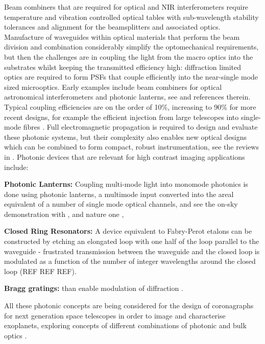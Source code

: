 \documentclass[letterpaper]{ar-1col}
\begin{document}
Beam combiners that are required for optical and NIR interferometers require temperature and vibration controlled optical tables with sub-wavelength stability tolerances and alignment for the beamsplitters and associated optics.
%
Manufacture of waveguides within optical materials that perform the beam division and combination considerably simplify the optomechanical requirements, but then the challenges are in coupling the light from the macro optics into the substrates whilst keeping the transmitted efficiency high: diffraction limited optics are required to form PSFs that couple efficiently into the near-single mode sized microoptics.
%
Early examples include beam combiners for optical astronomical interferometers \citep[for example the IOTA/IONIC beam combiner; ][]{Berger01} and photonic lanterns, see \citet{Leon-Saval10} and references therein.
%
Typical coupling efficiencies are on the order of 10\%, increasing to 90\% for more recent designs, for example the efficient injection from large telescopes into single-mode fibres \citep{Jovanovic17}.
%
Full electromagnetic propagation is required to design and evaluate these photonic systems, but their complexity also enables new optical designs which can be combined to form compact, robust instrumentation, see the reviews in \citet{Minardi21,Jovanovic23}.
%
Photonic devices that are relevant for high contrast imaging applications include:

{\bf Photonic Lanterns: } Coupling multi-mode light into monomode photonics is done using photonic lanterns, a multimode input converted into the areal equivalent of a number of single mode optical channels, \citep{Norris22} and see the on-sky demonstration with \citep{Norris20}, and nature one \cite{Norris20a},

{\bf Closed Ring Resonators: } A device equivalent to Fabry-Perot etalons can be constructed by etching an elongated loop with one half of the loop parallel to the waveguide - frustrated transmission between the waveguide and the closed loop is modulated as a function of the number of integer wavelengths around the closed loop (REF REF REF).

{\bf Bragg gratings: } than enable modulation of diffraction \citep{FaggingerAuer24}.

All these photonic concepts are being considered for the design of coronagraphs for next generation space telescopes in order to image and characterise exoplanets, exploring concepts of different combinations of photonic and bulk optics \citep{Desai23a}.
\end{document}
